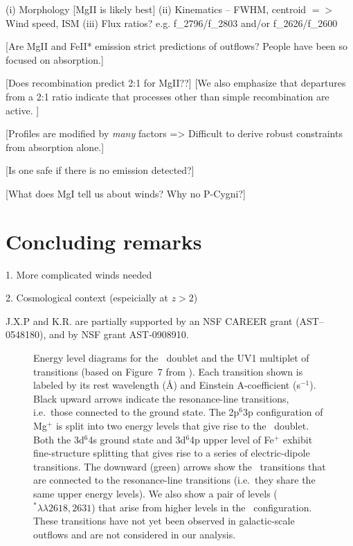 \documentclass[12pt,preprint]{aastex}
\begin{document}
   (i)  Morphology [MgII is likely best]
  (ii)  Kinematics  --  FWHM, centroid $=>$  Wind speed, ISM
 (iii)  Flux ratios?  e.g.   f\_2796/f\_2803 and/or f\_2626/f\_2600

[Are MgII and FeII* emission strict predictions of outflows?  People
have been so focused on absorption.]

[Does recombination predict 2:1 for MgII??]
[We also emphasize that departures from a 2:1
ratio indicate that processes other than simple recombination are
active. ]

[Profiles are modified by {\it many} factors => Difficult to derive
robust constraints from absorption alone.]

[Is one safe if there is no emission detected?]

[What does MgI tell us about winds?  Why no P-Cygni?]

\section{Concluding remarks}
\label{sec:conclude}

1. More complicated winds needed

2. Cosmological context (espeicially at $z>2$)

\acknowledgments

J.X.P and K.R. are partially supported
by an NSF CAREER grant (AST--0548180), and 
by NSF grant AST-0908910.

\clearpage

%
%



\clearpage







\begin{figure}
\caption{
Energy level diagrams for the \mgiid\ doublet and the UV1
multiplet of  transitions   
(based on Figure~7 from \cite{hmt+99}).
Each transition shown is
labeled by its rest wavelength (\AA) and Einstein A-coefficient
(s$^{-1}$). Black upward arrows
indicate the resonance-line transitions, i.e.\ those connected to the ground
state.  The 2p$^6$3p configuration of Mg$^+$ is split into
two energy levels that give rise to the \mgiid\ doublet.  
Both the 3d$^6$4s ground state and 3d$^6$4p upper level of Fe$^+$
exhibit fine-structure splitting that gives rise to a series of
electric-dipole transitions. 
The downward (green) arrows show the \feiis\ transitions that are connected to the
resonance-line transitions (i.e.\ they share the same upper energy
levels).  We also show a pair of levels ($^* \lambda\lambda
2618,2631$) that arise from higher levels in the \zconfig\
configuration.  These transitions have not yet been observed in
galactic-scale outflows and are not considered in our analysis.
}
\label{fig:energy}
\end{figure}
\end{document}
